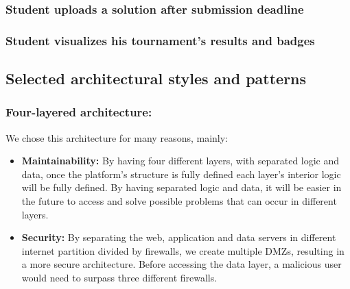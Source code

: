 \documentclass{article}
\begin{document}
{    \subsubsection{Student uploads a solution after submission deadline}
        \begin{figure}[H]
            \centering
            \caption{}
            \label{fig:}
        \end{figure}
    \subsubsection{Student visualizes his tournament's results and badges}
        \begin{figure}[H]
            \centering
            \caption{}
            \label{fig:}
        \end{figure}
\subsection{Selected architectural styles and patterns}
    \subsubsection{Four-layered architecture:} We chose this architecture for many reasons, mainly:
    \begin{itemize}
        \item \textbf{Maintainability:} By having four different layers, with separated logic and data, once the platform's structure is fully defined
        each layer's interior logic will be fully defined.
        By having separated logic and data, it will be easier in the future to access and solve possible problems that can occur in different 
        layers.
        \item \textbf{Security:} By separating the web, application and data servers in different internet partition divided by firewalls, we create multiple
        DMZs, resulting in a more secure architecture. Before accessing the data layer, a malicious user would need to surpass three different firewalls. 
    \end{itemize}
}
\end{document}
